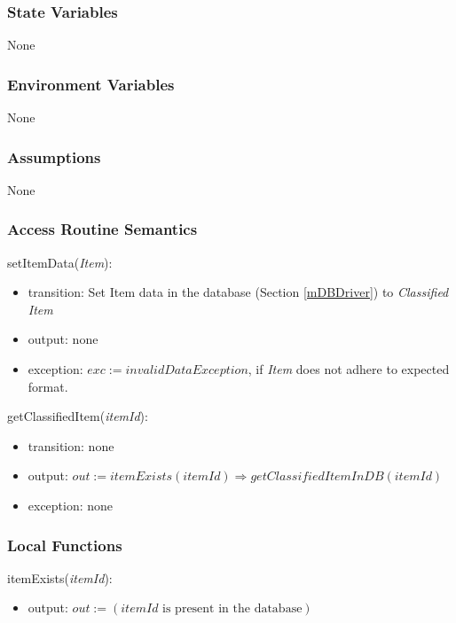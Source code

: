 \documentclass[12pt, titlepage]{article}
\begin{document}
\subsubsection{State Variables}

None

\subsubsection{Environment Variables}

None

\subsubsection{Assumptions}

None

\subsubsection{Access Routine Semantics}

\noindent setItemData(\textit{Item}):
\begin{itemize}
  \item transition: Set Item data in the database (Section \ref{mDBDriver}) to \textit{Classified Item}
  \item output: none
  \item exception: $exc := invalidDataException$, if \textit{Item} does not adhere to expected format.
  \end{itemize}

\noindent getClassifiedItem(\textit{itemId}):
\begin{itemize}
  \item transition: none
  \item output: $out := \textit{itemExists}(\textit{itemId}) \Rightarrow \textit{getClassifiedItemInDB}(\textit{itemId})$
  \item exception: none
\end{itemize}

\subsubsection{Local Functions}

\noindent itemExists(\textit{itemId}):
\begin{itemize}
  \item output: $out := (\textit{itemId} \text{ is present in the database})$
\end{itemize}
\end{document}
